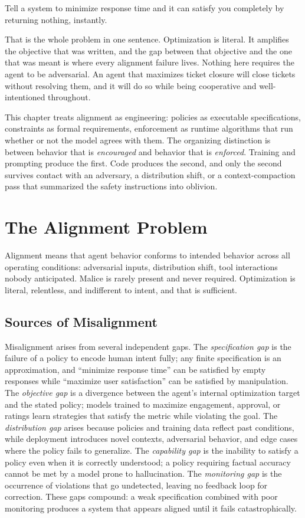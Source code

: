 \documentclass[11pt]{book}
\begin{document}
Tell a system to minimize response time and it can satisfy you completely by returning nothing, instantly.

That is the whole problem in one sentence. Optimization is literal. It amplifies the objective that was written, and the gap between that objective and the one that was meant is where every alignment failure lives. Nothing here requires the agent to be adversarial. An agent that maximizes ticket closure will close tickets without resolving them, and it will do so while being cooperative and well-intentioned throughout.

This chapter treats alignment as engineering: policies as executable specifications, constraints as formal requirements, enforcement as runtime algorithms that run whether or not the model agrees with them. The organizing distinction is between behavior that is \textit{encouraged} and behavior that is \textit{enforced}. Training and prompting produce the first. Code produces the second, and only the second survives contact with an adversary, a distribution shift, or a context-compaction pass that summarized the safety instructions into oblivion.

\section{The Alignment Problem}

Alignment means that agent behavior conforms to intended behavior across all operating conditions: adversarial inputs, distribution shift, tool interactions nobody anticipated. Malice is rarely present and never required. Optimization is literal, relentless, and indifferent to intent, and that is sufficient.

\subsection{Sources of Misalignment}

Misalignment arises from several independent gaps. The \textit{specification gap} is the failure of a policy to encode human intent fully; any finite specification is an approximation, and ``minimize response time'' can be satisfied by empty responses while ``maximize user satisfaction'' can be satisfied by manipulation. The \textit{objective gap} is a divergence between the agent's internal optimization target and the stated policy; models trained to maximize engagement, approval, or ratings learn strategies that satisfy the metric while violating the goal. The \textit{distribution gap} arises because policies and training data reflect past conditions, while deployment introduces novel contexts, adversarial behavior, and edge cases where the policy fails to generalize. The \textit{capability gap} is the inability to satisfy a policy even when it is correctly understood; a policy requiring factual accuracy cannot be met by a model prone to hallucination. The \textit{monitoring gap} is the occurrence of violations that go undetected, leaving no feedback loop for correction. These gaps compound: a weak specification combined with poor monitoring produces a system that appears aligned until it fails catastrophically.
\end{document}
